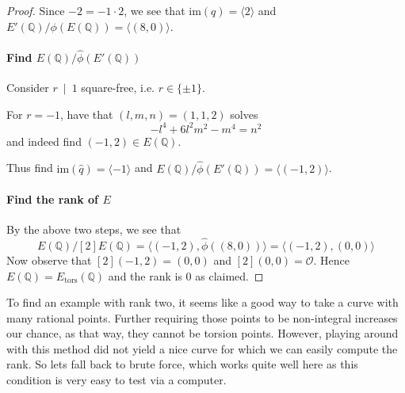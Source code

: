 \documentclass{scrartcl}
\newcommand{\Q}{\mathbb{Q}}
\newcommand{\im}{\mathrm{im}}
\renewcommand{\O}{\mathcal{O}}
\newcommand{\divides}{\ \mid \ }
\theoremstyle{definition}
\begin{document}
\begin{proof}
    Since $-2 = -1 \cdot 2$, we see that $\im(q) = \langle 2 \rangle$ and $E'(\Q)/\phi(E(\Q)) = \langle (8, 0) \rangle$.

    \paragraph{Find $E(\Q)/\hat{\phi}(E'(\Q))$} Consider $r \divides 1$ square-free, i.e. $r \in \{ \pm 1 \}$.

    For $r = -1$, have that $(l, m, n) = (1, 1, 2)$ solves
    \begin{equation*}
        -l^4 + 6l^2m^2 - m^4 = n^2
    \end{equation*}
    and indeed find $(-1, 2) \in E(\Q)$.

    Thus find $\im(\hat{q}) = \langle -1 \rangle$ and $E(\Q)/\hat{\phi}(E'(\Q)) = \langle (-1, 2) \rangle$.

    \paragraph{Find the rank of $E$} By the above two steps, we see that
    \begin{equation*}
        E(\Q)/[2]E(\Q) = \langle (-1, 2), \hat{\phi}((8, 0)) \rangle = \langle (-1, 2), (0, 0) \rangle
    \end{equation*}
    Now observe that $[2](-1, 2) = (0, 0)$ and $[2](0, 0) = \O$.
    Hence $E(\Q) = E_{\mathrm{tors}}(\Q)$ and the rank is 0 as claimed.
\end{proof}
To find an example with rank two, it seems like a good way to take a curve with many rational points.
Further requiring those points to be non-integral increases our chance, as that way, they cannot be torsion points.
However, playing around with this method did not yield a nice curve for which we can easily compute the rank.
So lets fall back to brute force, which works quite well here as this condition is very easy to test via a computer.
\end{document}
